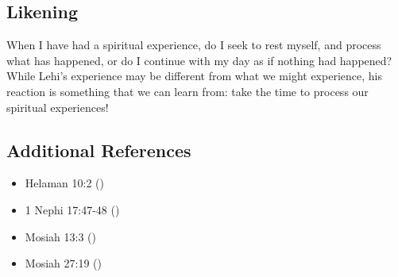 \documentclass[12pt]{report}
\begin{document}
\subsection{Likening\label{1Nephi1:7:likening}}
When I have had a spiritual experience, do I seek to rest myself, and process what has happened, or do I continue with my day as if nothing had happened?  While Lehi's experience may be different from what we might experience, his reaction is something that we can learn from: take the time to process our spiritual experiences!

\subsection{Additional References\label{1Nephi1:7:references}}
\begin{itemize}
\item Helaman 10:2 ()
\item 1 Nephi 17:47-48 ()
\item Mosiah 13:3 ()
\item Mosiah 27:19 ()
\end{itemize}
\printindex
\end{document}

